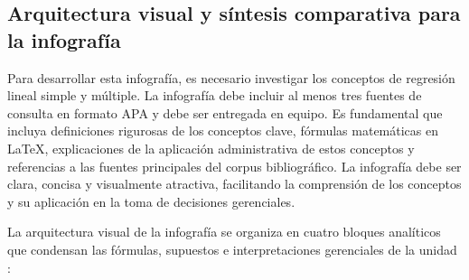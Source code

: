 {\subsection{Arquitectura visual y síntesis comparativa para la infografía}
Para desarrollar esta infografía, es necesario investigar los conceptos de regresión lineal simple y múltiple. La infografía debe incluir al menos tres fuentes de consulta en formato APA y debe ser entregada en equipo. Es fundamental que incluya definiciones rigurosas de los conceptos clave, fórmulas matemáticas en LaTeX, explicaciones de la aplicación administrativa de estos conceptos y referencias a las fuentes principales del corpus bibliográfico. La infografía debe ser clara, concisa y visualmente atractiva, facilitando la comprensión de los conceptos y su aplicación en la toma de decisiones gerenciales.

La arquitectura visual de la infografía se organiza en cuatro bloques analíticos que condensan las fórmulas, supuestos e interpretaciones gerenciales de la unidad \citep{anderson2012,hyndmanForecasting2021}:

}
